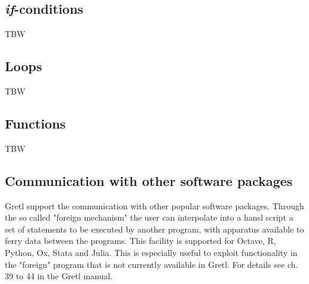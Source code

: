 \documentclass[11pt]{article}
\newcommand{\remph}[1]{{\color{myred}#1}}
\begin{document}
\subsection{\textit{if}-conditions}
\remph{TBW}

\subsection{Loops}
\remph{TBW}

\subsection{Functions}
\remph{TBW}

\subsection{Communication with other software packages}
\label{sec:foreign}
Gretl support the communication with other popular software packages. Through the so called "foreign mechanism" the user can interpolate into a hansl script a set of statements to be executed by another program, with apparatus available to ferry data between the programs. This facility is supported for Octave, R, Python, Ox, Stata and Julia. This is especially useful to exploit functionality in the "foreign" program that is not currently available in Gretl. For details see ch. 39 to 44 in the Gretl manual.
\end{document}
